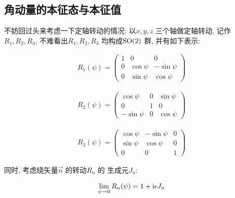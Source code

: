 \subsection{角动量的本征态与本征值}

不妨回过头来考虑一下定轴转动的情况: 以$x,y,z$ 
三个轴做定轴转动, 记作$R_1, R_2, R_3$,
不难看出$R_1,R_2,R_3$ 均构成${\rm SO}(2)$ 
群, 并有如下表示:

\begin{equation}\label{eq:r1_mat}
  \begin{aligned}
    R_1(\psi) =
    \begin{pmatrix}
      1 & 0 & 0 \\
      0 & \cos \psi & -\sin \psi \\
      0 & \sin \psi & \cos \psi
    \end{pmatrix}
  \end{aligned}
\end{equation}

\begin{equation}\label{eq:r2_mat}
  \begin{aligned}
    R_{2}(\psi) =
    \begin{pmatrix}
      \cos \psi & 0 & \sin \psi \\
      0 & 1 & 0 \\
      -\sin \psi & 0 & \cos \psi
    \end{pmatrix}
  \end{aligned}
\end{equation}

\begin{equation}\label{eq:r3_mat}
  \begin{aligned}
    R_{3}(\psi) =
    \begin{pmatrix}
      \cos \psi & -\sin \psi & 0 \\
      \sin \psi & \cos \psi & 0\\
      0 & 0 & 1
    \end{pmatrix}
  \end{aligned}
\end{equation}

同时, 考虑绕矢量$\vec{n}$ 的转动$R_{n}$ 的
生成元$J_{n}$:

\begin{equation}\label{eq:J_generator_infinitesimal}
  \begin{aligned}
    \lim_{\psi\to 0} R_{n}(\psi) = 1 + {\rm i} \epsilon J_{n}
  \end{aligned}
\end{equation}

